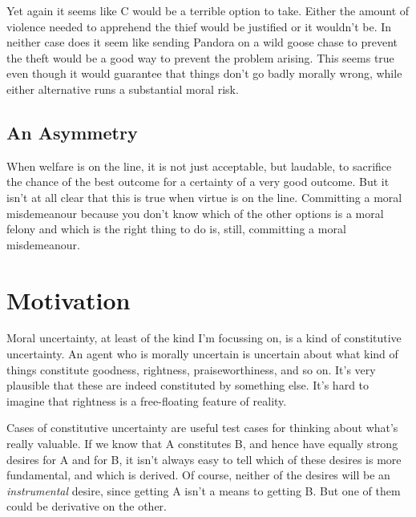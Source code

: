 Yet again it seems like C would be a terrible option to take. Either the amount of violence needed to apprehend the thief would be justified or it wouldn't be. In neither case does it seem like sending \gls{Pandora} on a wild goose chase to prevent the theft would be a good way to prevent the problem arising. This seems true even though it would guarantee that things don't go badly morally wrong, while either alternative runs a substantial moral risk.

\subsection{An Asymmetry}
\label{anasymmetry}

When welfare is on the line, it is not just acceptable, but laudable, to sacrifice the chance of the best outcome for a certainty of a very good outcome. But it isn't at all clear that this is true when virtue is on the line. Committing a moral misdemeanour because you don't know which of the other options is a moral felony and which is the right thing to do is, still, committing a moral misdemeanour.

\section{Motivation}
\label{motivation}

Moral uncertainty, at least of the kind I'm focussing on, is a kind of constitutive uncertainty. An agent who is morally uncertain is uncertain about what kind of things constitute goodness, rightness, praiseworthiness, and so on. It's very plausible that these are indeed constituted by something else. It's hard to imagine that rightness is a free-floating feature of reality.

Cases of constitutive uncertainty are useful test cases for thinking about what's really valuable. If we know that A constitutes B, and hence have equally strong desires for A and for B, it isn't always easy to tell which of these desires is more fundamental, and which is derived. Of course, neither of the desires will be an \emph{instrumental} desire, since getting A isn't a means to getting B. But one of them could be derivative on the other.

